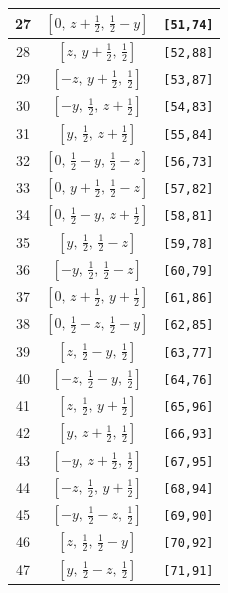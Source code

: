 \documentclass[fleqn,8pt]{jsarticle}
\begin{document}
\begin{longtable}{ccc}
27 & $\left[ 0,\, z + \frac{1}{2},\, \frac{1}{2} - y \right]$ & {\tt [51,74]} \\ \hline
28 & $\left[ z,\, y + \frac{1}{2},\, \frac{1}{2} \right]$ & {\tt [52,88]} \\ \hline
29 & $\left[ - z,\, y + \frac{1}{2},\, \frac{1}{2} \right]$ & {\tt [53,87]} \\ \hline
30 & $\left[ - y,\, \frac{1}{2},\, z + \frac{1}{2} \right]$ & {\tt [54,83]} \\ \hline
31 & $\left[ y,\, \frac{1}{2},\, z + \frac{1}{2} \right]$ & {\tt [55,84]} \\ \hline
32 & $\left[ 0,\, \frac{1}{2} - y,\, \frac{1}{2} - z \right]$ & {\tt [56,73]} \\ \hline
33 & $\left[ 0,\, y + \frac{1}{2},\, \frac{1}{2} - z \right]$ & {\tt [57,82]} \\ \hline
34 & $\left[ 0,\, \frac{1}{2} - y,\, z + \frac{1}{2} \right]$ & {\tt [58,81]} \\ \hline
35 & $\left[ y,\, \frac{1}{2},\, \frac{1}{2} - z \right]$ & {\tt [59,78]} \\ \hline
36 & $\left[ - y,\, \frac{1}{2},\, \frac{1}{2} - z \right]$ & {\tt [60,79]} \\ \hline
37 & $\left[ 0,\, z + \frac{1}{2},\, y + \frac{1}{2} \right]$ & {\tt [61,86]} \\ \hline
38 & $\left[ 0,\, \frac{1}{2} - z,\, \frac{1}{2} - y \right]$ & {\tt [62,85]} \\ \hline
39 & $\left[ z,\, \frac{1}{2} - y,\, \frac{1}{2} \right]$ & {\tt [63,77]} \\ \hline
40 & $\left[ - z,\, \frac{1}{2} - y,\, \frac{1}{2} \right]$ & {\tt [64,76]} \\ \hline
41 & $\left[ z,\, \frac{1}{2},\, y + \frac{1}{2} \right]$ & {\tt [65,96]} \\ \hline
42 & $\left[ y,\, z + \frac{1}{2},\, \frac{1}{2} \right]$ & {\tt [66,93]} \\ \hline
43 & $\left[ - y,\, z + \frac{1}{2},\, \frac{1}{2} \right]$ & {\tt [67,95]} \\ \hline
44 & $\left[ - z,\, \frac{1}{2},\, y + \frac{1}{2} \right]$ & {\tt [68,94]} \\ \hline
45 & $\left[ - y,\, \frac{1}{2} - z,\, \frac{1}{2} \right]$ & {\tt [69,90]} \\ \hline
46 & $\left[ z,\, \frac{1}{2},\, \frac{1}{2} - y \right]$ & {\tt [70,92]} \\ \hline
47 & $\left[ y,\, \frac{1}{2} - z,\, \frac{1}{2} \right]$ & {\tt [71,91]} \\ \hline

\end{longtable}
\end{document}
